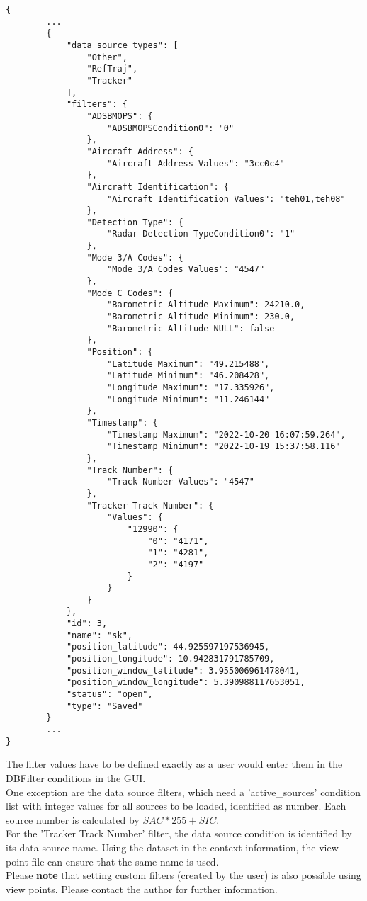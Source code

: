 \begin{lstlisting}[basicstyle=\small\ttfamily]
{
        ...
        {
            "data_source_types": [
                "Other",
                "RefTraj",
                "Tracker"
            ],
            "filters": {
                "ADSBMOPS": {
                    "ADSBMOPSCondition0": "0"
                },
                "Aircraft Address": {
                    "Aircraft Address Values": "3cc0c4"
                },
                "Aircraft Identification": {
                    "Aircraft Identification Values": "teh01,teh08"
                },
                "Detection Type": {
                    "Radar Detection TypeCondition0": "1"
                },
                "Mode 3/A Codes": {
                    "Mode 3/A Codes Values": "4547"
                },
                "Mode C Codes": {
                    "Barometric Altitude Maximum": 24210.0,
                    "Barometric Altitude Minimum": 230.0,
                    "Barometric Altitude NULL": false
                },
                "Position": {
                    "Latitude Maximum": "49.215488",
                    "Latitude Minimum": "46.208428",
                    "Longitude Maximum": "17.335926",
                    "Longitude Minimum": "11.246144"
                },
                "Timestamp": {
                    "Timestamp Maximum": "2022-10-20 16:07:59.264",
                    "Timestamp Minimum": "2022-10-19 15:37:58.116"
                },
                "Track Number": {
                    "Track Number Values": "4547"
                },
                "Tracker Track Number": {
                    "Values": {
                        "12990": {
                            "0": "4171",
                            "1": "4281",
                            "2": "4197"
                        }
                    }
                }
            },
            "id": 3,
            "name": "sk",
            "position_latitude": 44.925597197536945,
            "position_longitude": 10.942831791785709,
            "position_window_latitude": 3.955006961478041,
            "position_window_longitude": 5.390988117653051,
            "status": "open",
            "type": "Saved"
        }
        ...
}
\end{lstlisting}        

The filter values have to be defined exactly as a user would enter them in the DBFilter conditions in the GUI. \\

One exception are the data source filters, which need a 'active\_sources' condition list with integer values for all sources to be loaded, identified as number. Each source number is calculated by $SAC*255+SIC$. \\

For the 'Tracker Track Number' filter, the data source condition is identified by its data source name. Using the dataset in the context information, the view point file can ensure that the same name is used. \\

Please \textbf{note} that setting custom filters (created by the user) is also possible using view points. Please contact the author for further information.
